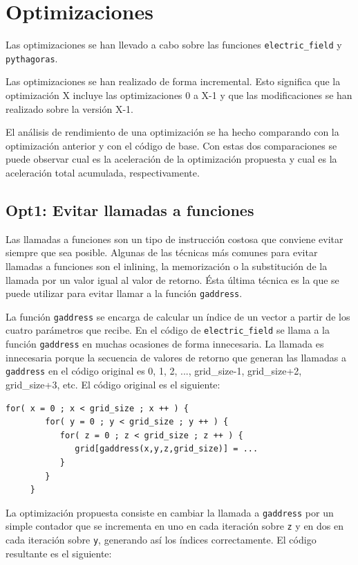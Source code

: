 \section{Optimizaciones}

Las optimizaciones se han llevado a cabo sobre las funciones
\texttt{electric\_field} y \texttt{pythagoras}.

Las optimizaciones se han realizado de forma incremental. Esto significa que la
optimizaci\'{o}n X incluye las optimizaciones 0 a X-1 y que las modificaciones
se han realizado sobre la versi\'{o}n X-1.

El an\'{a}lisis de rendimiento de una optimizaci\'{o}n se ha hecho comparando
con la optimizaci\'{o}n anterior y con el c\'{o}digo de base. Con estas dos
comparaciones se puede observar cual es la aceleraci\'{o}n de la optimizaci\'{o}n
propuesta y cual es la aceleraci\'{o}n total acumulada, respectivamente.

\subsection{Opt1: Evitar llamadas a funciones}

Las llamadas a funciones son un tipo de instrucci\'{o}n costosa que conviene
evitar siempre que sea posible. Algunas de las t\'{e}cnicas m\'{a}s comunes
para evitar llamadas a funciones son el inlining, la memorizaci\'{o}n o la
substituci\'{o}n de la llamada por un valor igual al valor de retorno.
\'{E}sta \'{u}ltima t\'{e}cnica es la que se puede utilizar para evitar llamar
a la funci\'{o}n \texttt{gaddress}.

La funci\'{o}n \texttt{gaddress} se encarga de calcular un \'{i}ndice de un
vector a partir de los cuatro par\'{a}metros que recibe. En el c\'{o}digo de
\texttt{electric\_field} se llama a la funci\'{o}n \texttt{gaddress} en
muchas ocasiones de forma innecesaria. La llamada es innecesaria porque la
secuencia de valores de retorno que generan las llamadas a \texttt{gaddress}
en el c\'{o}digo original es 0, 1, 2, ..., grid\_size-1, grid\_size+2,
grid\_size+3, etc. El c\'{o}digo original es el siguiente:

\begin{lstlisting}[]
     for( x = 0 ; x < grid_size ; x ++ ) {
        for( y = 0 ; y < grid_size ; y ++ ) {
           for( z = 0 ; z < grid_size ; z ++ ) {
              grid[gaddress(x,y,z,grid_size)] = ...
           }
        }
     }
\end{lstlisting}

La optimizaci\'{o}n propuesta consiste en cambiar la llamada a
\texttt{gaddress} por un simple contador que se incrementa en uno en cada
iteraci\'{o}n sobre \texttt{z} y en dos en cada iteraci\'{o}n sobre
\texttt{y}, generando as\'{i} los \'{i}ndices correctamente. El c\'{o}digo
resultante es el siguiente:

